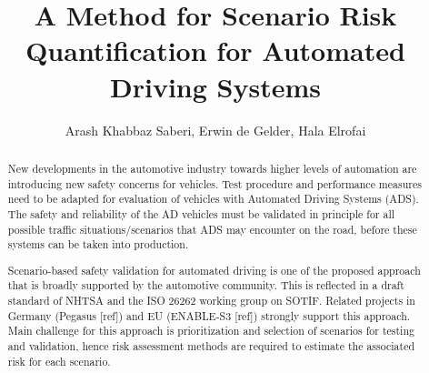 \documentclass[letterpaper, 10 pt, conference]{ieeeconf}  %
\title{\LARGE \bf
A Method for Scenario Risk Quantification for Automated Driving Systems
}
\author{Arash Khabbaz Saberi, Erwin de Gelder, Hala Elrofai}
\begin{document}
\maketitle
\thispagestyle{empty}
\pagestyle{empty}


\begin{abstract}
	
	



	
New developments in the automotive industry towards higher levels of automation are introducing new safety concerns for vehicles. Test procedure and performance measures need to be adapted for evaluation of vehicles with Automated Driving Systems (ADS). The safety and reliability of the AD vehicles must be validated in principle for all possible traffic situations/scenarios that ADS may encounter on the road, before these systems can be taken into production.

Scenario-based safety validation for automated driving is one of the proposed approach that is broadly supported by the automotive community. This is reflected in a draft standard of NHTSA and the ISO 26262 working group on SOTIF. Related projects in Germany (Pegasus [ref]) and EU (ENABLE-S3 [ref]) strongly support this approach.
Main challenge for this approach is prioritization and selection of scenarios for testing and validation, hence risk assessment methods are required to estimate the associated risk for each scenario.


\end{abstract}
\end{document}
